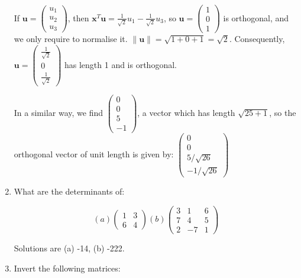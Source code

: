 \documentclass{article}
\begin{document}
\begin{enumerate}
If $\boldsymbol{u} = \left( \begin{array}{r}u_{1} \\ u_{2} \\u_{3} \end{array} \right)$, then $\boldsymbol{x}^{T}\boldsymbol{u} = \frac{1}{\sqrt{2}}u_{1}-\frac{1}{\sqrt{2}}u_{3}$, so $\boldsymbol{u} = \left( \begin{array}{r} 1 \\ 0 \\1 \end{array} \right)$ is orthogonal, and we only require to normalise it.   $\lVert \boldsymbol{u} \rVert = \sqrt{1 + 0 + 1} = \sqrt{2}$.   Consequently, $\boldsymbol{u} = \left( \begin{array}{r} \frac{1}{\sqrt{2}} \\ 0 \\ \frac{1}{\sqrt{2}} \end{array} \right)$ has length 1 and is orthogonal.

In a similar way, we find $\left( \begin{array}{r} 0 \\ 0 \\ 5 \\ -1 \end{array} \right)$, a vector which has length $\sqrt{25+1}$, so the orthogonal vector of unit length is given by:  $\left( \begin{array}{r} 0 \\ 0 \\ 5/\sqrt{26} \\ -1/\sqrt{26} \end{array} \right)$

\item What are the determinants of:

\begin{displaymath}
(a) \left( \begin{array}{rr} 1 & 3 \\ 6 & 4 \end{array} \right)
(b) \left( \begin{array}{rrr} 3 & 1 & 6 \\ 7 & 4 & 5 \\ 2 & -7 & 1 \end{array} \right)
\end{displaymath}

Solutions are (a) -14, (b) -222.

\item Invert the following matrices:


\end{enumerate}
\end{document}
